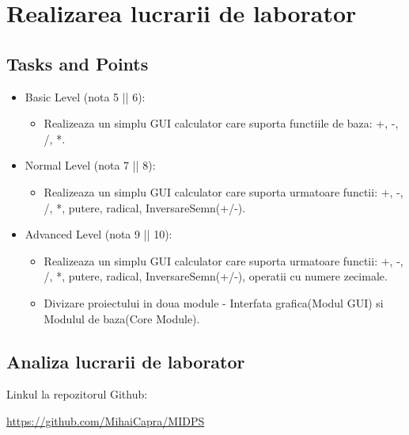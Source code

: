 \section{Realizarea lucrarii de laborator}

\subsection{Tasks and Points}
\begin{itemize}
	\item Basic Level (nota 5 || 6):
	
	\begin{itemize}
		\item Realizeaza un simplu GUI calculator care suporta functiile de baza: +, -, /, *.
	\end{itemize}
	
	\item Normal Level (nota 7 || 8):
	
	\begin{itemize}
		\item Realizeaza un simplu GUI calculator care suporta urmatoare functii: +, -, /, *, putere, radical, InversareSemn(+/-).
	\end{itemize}
	\item Advanced Level (nota 9 || 10):
	
	\begin{itemize}
		\item Realizeaza un simplu GUI calculator care suporta urmatoare functii: +, -, /, *, putere, radical, InversareSemn(+/-), operatii cu numere zecimale.
	\end{itemize}
	\begin{itemize}
		\item Divizare proiectului in doua module - Interfata grafica(Modul GUI) si Modulul de baza(Core Module).
	\end{itemize}
\end{itemize}
\subsection{Analiza lucrarii de laborator}

Linkul la repozitorul Github:\\
\begin{center}
\url{https://github.com/MihaiCapra/MIDPS}
\end{center}

